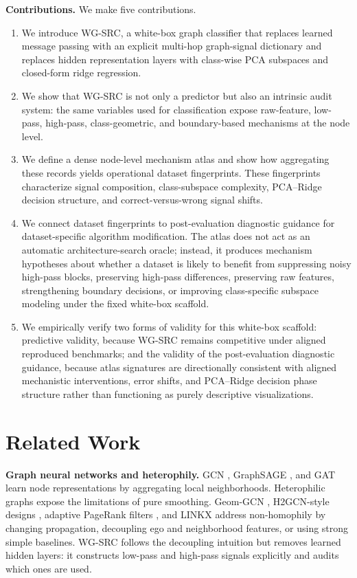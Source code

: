 \documentclass{article}
\newcommand{\SRC}{\textsc{WG-SRC}}
\begin{document}
\medskip
\noindent\textbf{Contributions.} We make five contributions.
\begin{enumerate}[leftmargin=1.5em]
    \item We introduce \SRC, a white-box graph classifier that replaces learned
    message passing with an explicit multi-hop graph-signal dictionary and
    replaces hidden representation layers with class-wise PCA subspaces and
    closed-form ridge regression.

    \item We show that \SRC{} is not only a predictor but also an intrinsic
    audit system: the same variables used for classification expose raw-feature,
    low-pass, high-pass, class-geometric, and boundary-based mechanisms at the
    node level.

    \item We define a dense node-level mechanism atlas and show how aggregating
    these records yields operational dataset fingerprints. These fingerprints
    characterize signal composition, class-subspace complexity, PCA--Ridge
    decision structure, and correct-versus-wrong signal shifts.

    \item We connect dataset fingerprints to post-evaluation diagnostic guidance
for dataset-specific algorithm modification. The atlas does not act as an
automatic architecture-search oracle; instead, it produces mechanism
hypotheses about whether a dataset is likely to benefit from suppressing noisy
high-pass blocks, preserving high-pass differences, preserving raw features,
strengthening boundary decisions, or improving class-specific subspace
modeling under the fixed white-box scaffold.

\item We empirically verify two forms of validity for this white-box
scaffold: predictive validity, because \SRC{} remains competitive under
aligned reproduced benchmarks; and the validity of the post-evaluation diagnostic guidance, because atlas
signatures are directionally consistent with aligned mechanistic interventions,
error shifts, and PCA--Ridge decision phase structure rather than functioning
as purely descriptive visualizations.

\end{enumerate}


\section{Related Work}
\textbf{Graph neural networks and heterophily.} GCN \citep{kipf2017gcn}, GraphSAGE \citep{hamilton2017graphsage}, and GAT \citep{velickovic2018gat} learn node representations by aggregating local neighborhoods. Heterophilic graphs expose the limitations of pure smoothing. Geom-GCN \citep{pei2020geomgcn}, H2GCN-style designs \citep{zhu2020beyond}, adaptive PageRank filters \citep{chien2021gprgnn}, and LINKX \citep{lim2021linkx} address non-homophily by changing propagation, decoupling ego and neighborhood features, or using strong simple baselines. \SRC{} follows the decoupling intuition but removes learned hidden layers: it constructs low-pass and high-pass signals explicitly and audits which ones are used.
\end{document}
